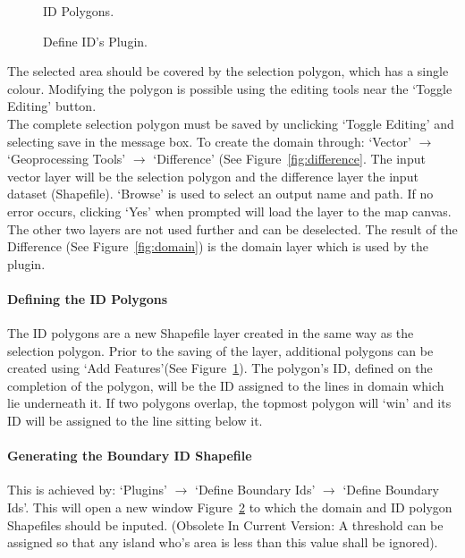 		\begin{figure}[h!]
			\centering
			\caption{ID Polygons.}
			\label{fig:ids}
		\end{figure}

		\begin{figure}[h!]
			\centering
			\caption{Define ID's Plugin.}
			\label{fig:defineId}
		\end{figure}
		
		The selected area should be covered by the selection polygon, which has a single colour. Modifying the polygon is possible using the editing tools near the `Toggle Editing' button.\\ 

The complete selection polygon must be saved by unclicking `Toggle Editing' and selecting save in the message box. To create the domain through: `Vector' $\rightarrow$ `Geoprocessing Tools' $\rightarrow$ `Difference' (See Figure~\ref{fig:difference}. The input vector layer will be the selection polygon and the difference layer the input dataset (Shapefile). `Browse' is used to select an output name and path. If no error occurs, clicking `Yes' when prompted will load the layer to the map canvas. The other two layers are not used further and can be deselected. The result of the Difference (See Figure~\ref{fig:domain}) is the domain layer which is used by the plugin.

		\paragraph{Defining the ID Polygons\\}
		\label{sec:defineID}
		The ID polygons are a new Shapefile layer created in the same way as the selection polygon.  Prior to the saving of the layer, additional polygons can be created using `Add Features'(See Figure~\ref{fig:ids}). The polygon's ID, defined on the completion of the polygon, will be the ID assigned to the lines in domain which lie underneath it. If two polygons overlap, the topmost polygon will `win' and its ID will be assigned to the line sitting below it.

		\paragraph{Generating the Boundary ID Shapefile\\}
		This is achieved by: `Plugins' $\rightarrow$ `Define Boundary Ids' $\rightarrow$ `Define Boundary Ids'.  This will open a new window Figure~\ref{fig:defineId} to which the domain and ID polygon Shapefiles should be inputed. (Obsolete In Current Version: A threshold can be assigned so that any island who's area is less than this value shall be ignored). 




